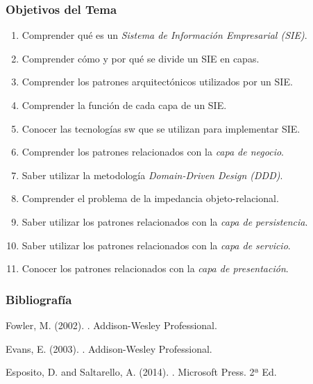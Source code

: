 \documentclass[a4paper,slidestop,xcolor=pst,dvips,blue]{beamer}
\begin{document}
\begin{frame}[c]
    \frametitle{Objetivos del Tema}
    \begin{enumerate}[<+->]
         \item Comprender qué es un \emph{Sistema de Información Empresarial (SIE)}.
         \item Comprender cómo y por qué se divide un SIE en capas.
         \item Comprender los patrones arquitectónicos utilizados por un SIE.
         \item Comprender la función de cada capa de un SIE.
         \item Conocer las tecnologías sw que se utilizan para implementar SIE.
         \item Comprender los patrones relacionados con la \emph{capa de negocio}.
         \item Saber utilizar la metodología \emph{Domain-Driven Design (DDD)}.
         \item Comprender el problema de la impedancia objeto-relacional.
         \item Saber utilizar los patrones relacionados con la \emph{capa de persistencia}.
         \item Saber utilizar los patrones relacionados con la \emph{capa de servicio}.
         \item Conocer los patrones relacionados con la \emph{capa de presentación}.
    \end{enumerate}
\end{frame}

\begin{frame}[c]
    \frametitle{Bibliografía}
    \begin{thebibliography}{1}

        Fowler, M. (2002).
        .
        \newblock Addison-Wesley Professional.

        Evans, E. (2003).
        .
        \newblock Addison-Wesley Professional.

        Esposito, D. and Saltarello, A. (2014).
        .
        \newblock Microsoft Press. 2ª Ed.

    \end{thebibliography}
\end{frame}
\end{document}
